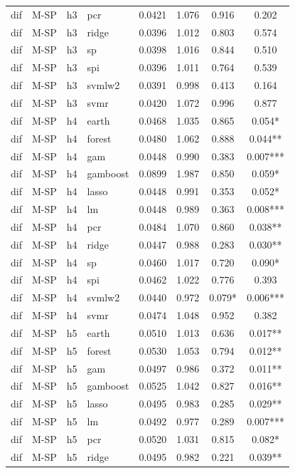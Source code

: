 \begin{ThreePartTable}
\begin{longtable}[t]{llclcccc}
dif & M-SP & h3 & pcr & 0.0421 & 1.076 & 0.916 & 0.202\\
dif & M-SP & h3 & ridge & 0.0396 & 1.012 & 0.803 & 0.574\\
dif & M-SP & h3 & sp & 0.0398 & 1.016 & 0.844 & 0.510\\
dif & M-SP & h3 & spi & 0.0396 & 1.011 & 0.764 & 0.539\\
dif & M-SP & h3 & svmlw2 & 0.0391 & 0.998 & 0.413 & 0.164\\
dif & M-SP & h3 & svmr & 0.0420 & 1.072 & 0.996 & 0.877\\
\addlinespace
dif & M-SP & h4 & earth & 0.0468 & 1.035 & 0.865 & 0.054*\\
dif & M-SP & h4 & forest & 0.0480 & 1.062 & 0.888 & 0.044**\\
dif & M-SP & h4 & gam & 0.0448 & 0.990 & 0.383 & 0.007***\\
dif & M-SP & h4 & gamboost & 0.0899 & 1.987 & 0.850 & 0.059*\\
dif & M-SP & h4 & lasso & 0.0448 & 0.991 & 0.353 & 0.052*\\
dif & M-SP & h4 & lm & 0.0448 & 0.989 & 0.363 & 0.008***\\
dif & M-SP & h4 & pcr & 0.0484 & 1.070 & 0.860 & 0.038**\\
dif & M-SP & h4 & ridge & 0.0447 & 0.988 & 0.283 & 0.030**\\
dif & M-SP & h4 & sp & 0.0460 & 1.017 & 0.720 & 0.090*\\
dif & M-SP & h4 & spi & 0.0462 & 1.022 & 0.776 & 0.393\\
dif & M-SP & h4 & svmlw2 & 0.0440 & 0.972 & 0.079* & 0.006***\\
dif & M-SP & h4 & svmr & 0.0474 & 1.048 & 0.952 & 0.382\\
\addlinespace
dif & M-SP & h5 & earth & 0.0510 & 1.013 & 0.636 & 0.017**\\
dif & M-SP & h5 & forest & 0.0530 & 1.053 & 0.794 & 0.012**\\
dif & M-SP & h5 & gam & 0.0497 & 0.986 & 0.372 & 0.011**\\
dif & M-SP & h5 & gamboost & 0.0525 & 1.042 & 0.827 & 0.016**\\
dif & M-SP & h5 & lasso & 0.0495 & 0.983 & 0.285 & 0.029**\\
dif & M-SP & h5 & lm & 0.0492 & 0.977 & 0.289 & 0.007***\\
dif & M-SP & h5 & pcr & 0.0520 & 1.031 & 0.815 & 0.082*\\
dif & M-SP & h5 & ridge & 0.0495 & 0.982 & 0.221 & 0.039**\\

\end{longtable}
\end{ThreePartTable}
